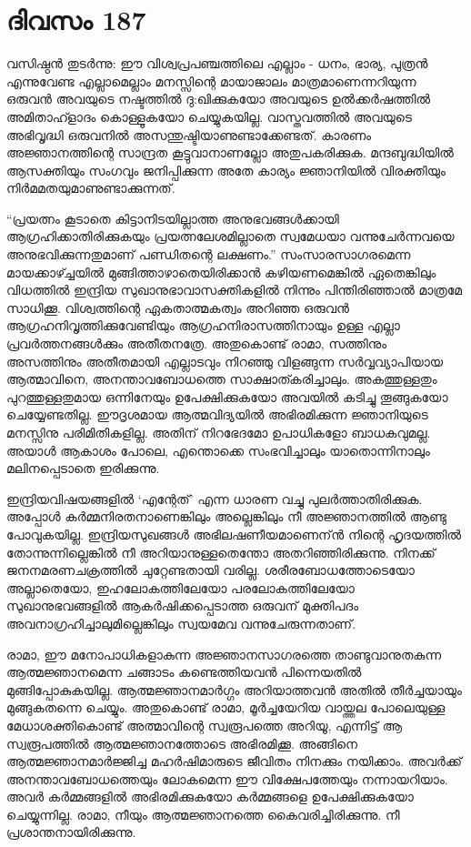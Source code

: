 \section{ദിവസം 187}


വസിഷ്ഠൻ തുടർന്നു: ഈ വിശ്വപ്രപഞ്ചത്തിലെ എല്ലാം - ധനം, ഭാര്യ, പുത്രൻ എന്നുവേണ്ട എല്ലാമെല്ലാം മനസ്സിന്റെ മായാജാലം മാത്രമാണെന്നറിയുന്ന ഒരുവൻ അവയുടെ നഷ്ടത്തിൽ ദു:ഖിക്കുകയോ അവയുടെ ഉല്‍ക്കര്‍ഷത്തില്‍ അമിതാഹ്ളാദം കൊള്ളൂകയോ ചെയ്യുകയില്ല. വാസ്തവത്തില്‍ അവയുടെ അഭിവൃദ്ധി ഒരുവനില്‍ അസന്തുഷ്ടിയാണുണ്ടാക്കേണ്ടത്. കാരണം അജ്ഞാനത്തിന്റെ സാന്ദ്രത കൂട്ടുവാനാണല്ലോ അതുപകരിക്കുക. മന്ദബുദ്ധിയിൽ ആസക്തിയും സംഗവും ജനിപ്പിക്കുന്ന അതേ കാര്യം ജ്ഞാനിയിൽ വിരക്തിയും നിർമമതയുമാണുണ്ടാക്കുന്നത്.

“പ്രയത്നം കൂടാതെ കിട്ടാനിടയില്ലാത്ത അനുഭവങ്ങൾക്കായി ആഗ്രഹിക്കാതിരിക്കുകയും പ്രയത്നലേശമില്ലാതെ സ്വമേധയാ വന്നുചേർന്നവയെ അനുഭവിക്കുന്നതുമാണ്‌ പണ്ഡിതന്റെ ലക്ഷണം.” സംസാരസാഗരമെന്ന മായക്കാഴ്ച്ചയിൽ മുങ്ങിത്താഴാതെയിരിക്കാൻ കഴിയണമെങ്കിൽ ഏതെങ്കിലും വിധത്തിൽ ഇന്ദ്രിയ സുഖാനുഭാവാസക്തികളിൽ നിന്നും പിന്തിരിഞ്ഞാൽ മാത്രമേ സാധിക്കൂ. വിശ്വത്തിന്റെ ഏകതാത്മകത്വം അറിഞ്ഞ ഒരുവൻ ആഗ്രഹനിവൃത്തിക്കുവേണ്ടിയും ആഗ്രഹനിരാസത്തിനായും ഉള്ള എല്ലാ പ്രവർത്തനങ്ങൾക്കും അതീതനത്രേ. അതുകൊണ്ട് രാമാ, സത്തിനും അസത്തിനും അതീതമായി എല്ലാടവും നിറഞ്ഞു വിളങ്ങുന്ന സർവ്വവ്യാപിയായ ആത്മാവിനെ, അനന്താവബോധത്തെ സാക്ഷാത്കരിച്ചാലും. അകത്തുള്ളതും പുറത്തുള്ളതുമായ ഒന്നിനേയും ഉപേക്ഷിക്കുകയോ അവയിൽ കടിച്ചു തൂങ്ങുകയോ ചെയ്യേണ്ടതില്ല. ഈദൃശമായ ആത്മവിദ്യയിൽ അഭിരമിക്കുന്ന ജ്ഞാനിയുടെ മനസ്സിനു പരിമിതികളില്ല. അതിന്‌ നിറഭേദമോ ഉപാധികളോ ബാധകവുമല്ല. അയാൾ ആകാശം പോലെ, എന്തൊക്കെ സംഭവിച്ചാലും യാതൊന്നിനാലും മലിനപ്പെടാതെ ഇരിക്കുന്നു.

ഇന്ദ്രിയവിഷയങ്ങളിൽ ‘എന്റേത്’ എന്ന ധാരണ വച്ചു പുലർത്താതിരിക്കുക. അപ്പോൾ കർമ്മനിരതനാണെങ്കിലും അല്ലെങ്കിലും നീ അജ്ഞാനത്തിൽ ആണ്ടു പോവുകയില്ല. ഇന്ദ്രിയസുഖങ്ങൾ അഭിലഷണീയമാണെന്ന്‍ നിന്റെ ഹൃദയത്തിൽ തോന്നുന്നില്ലെങ്കിൽ നീ അറിയാനുള്ളതെന്തോ അതറിഞ്ഞിരിക്കുന്നു. നിനക്ക് ജനനമരണചക്രത്തിൽ ചുറ്റേണ്ടതായി വരില്ല. ശരീരബോധത്തോടെയോ അല്ലാതെയോ, ഇഹലോകത്തിലേയോ പരലോകത്തിലേയോ സുഖാനുഭവങ്ങളിൽ ആകർഷിക്കപ്പെടാത്ത ഒരുവന്‌ മുക്തിപദം അവനാഗ്രഹിച്ചാലുമില്ലെങ്കിലും സ്വയമേവ വന്നുചേരുന്നതാണ്.

രാമാ, ഈ മനോപാധികളാകുന്ന അജ്ഞാനസാഗരത്തെ താണ്ടുവാനുതകുന്ന ആത്മജ്ഞാനമെന്ന ചങ്ങാടം കണ്ടെത്തിയവൻ പിന്നെയതില്‍ മുങ്ങിപ്പോകുകയില്ല. ആത്മജ്ഞാനമാർഗ്ഗം അറിയാത്തവന്‍ അതിൽ തീർച്ചയായും മുങ്ങുകതന്നെ ചെയ്യും. അതുകൊണ്ട് രാമാ, മൂർച്ചയേറിയ വായ്ത്തല പോലെയുള്ള മേധാശക്തികൊണ്ട് അത്മാവിന്റെ സ്വരൂപത്തെ അറിയൂ, എന്നിട്ട് ആ സ്വരൂപത്തിൽ ആത്മജ്ഞാനത്തോടെ അഭിരമിക്കൂ. അങ്ങിനെ ആത്മജ്ഞാനമാർജ്ജിച്ച മഹർഷിമാരുടെ ജീവിതം നിനക്കും നയിക്കാം. അവർക്ക് അനന്താവബോധത്തെയും ലോകമെന്ന ഈ വിക്ഷേപത്തേയും നന്നായറിയാം. അവർ കർമ്മങ്ങളിൽ അഭിരമിക്കുകയോ കർമ്മങ്ങളെ ഉപേക്ഷിക്കുകയോ ചെയ്യുന്നില്ല. രാമാ, നീയും ആത്മജ്ഞാനത്തെ കൈവരിച്ചിരിക്കുന്നു. നീ പ്രശാന്തനായിരിക്കുന്നു. 

